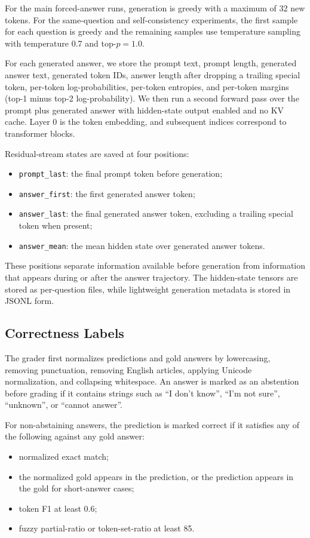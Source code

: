 \documentclass{article}
\begin{document}
For the main forced-answer runs, generation is greedy with a maximum of 32 new
tokens. For the same-question and self-consistency experiments, the first sample
for each question is greedy and the remaining samples use temperature sampling
with temperature 0.7 and top-$p=1.0$.

For each generated answer, we store the prompt text, prompt length, generated
answer text, generated token IDs, answer length after dropping a trailing special
token, per-token log-probabilities, per-token entropies, and per-token margins
(top-1 minus top-2 log-probability). We then run a second forward pass over the
prompt plus generated answer with hidden-state output enabled and no KV cache.
Layer 0 is the token embedding, and subsequent indices correspond to transformer
blocks.

Residual-stream states are saved at four positions:
\begin{itemize}
    \item \texttt{prompt\_last}: the final prompt token before generation;
    \item \texttt{answer\_first}: the first generated answer token;
    \item \texttt{answer\_last}: the final generated answer token, excluding a
    trailing special token when present;
    \item \texttt{answer\_mean}: the mean hidden state over generated answer
    tokens.
\end{itemize}

These positions separate information available before generation from information
that appears during or after the answer trajectory. The hidden-state tensors are
stored as per-question files, while lightweight generation metadata is stored in
JSONL form.

\subsection{Correctness Labels}

The grader first normalizes predictions and gold answers by lowercasing,
removing punctuation, removing English articles, applying Unicode normalization,
and collapsing whitespace. An answer is marked as an abstention before grading if
it contains strings such as ``I don't know'', ``I'm not sure'', ``unknown'', or
``cannot answer''.

For non-abstaining answers, the prediction is marked correct if it satisfies any
of the following against any gold answer:
\begin{itemize}
    \item normalized exact match;
    \item the normalized gold appears in the prediction, or the prediction appears
    in the gold for short-answer cases;
    \item token F1 at least 0.6;
    \item fuzzy partial-ratio or token-set-ratio at least 85.
\end{itemize}
\end{document}
